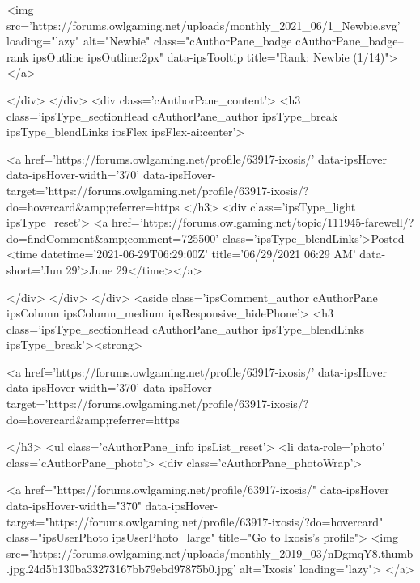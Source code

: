 <img src='https://forums.owlgaming.net/uploads/monthly_2021_06/1_Newbie.svg' loading="lazy" alt="Newbie" class="cAuthorPane_badge cAuthorPane_badge--rank ipsOutline ipsOutline:2px" data-ipsTooltip title="Rank: Newbie (1/14)">
					</a>
				
			</div>
		</div>
		<div class='cAuthorPane_content'>
			<h3 class='ipsType_sectionHead cAuthorPane_author ipsType_break ipsType_blendLinks ipsFlex ipsFlex-ai:center'>
				


<a href='https://forums.owlgaming.net/profile/63917-ixosis/' data-ipsHover data-ipsHover-width='370' data-ipsHover-target='https://forums.owlgaming.net/profile/63917-ixosis/?do=hovercard&amp;referrer=https%
			</h3>
			<div class='ipsType_light ipsType_reset'>
				<a href='https://forums.owlgaming.net/topic/111945-farewell/?do=findComment&amp;comment=725500' class='ipsType_blendLinks'>Posted <time datetime='2021-06-29T06:29:00Z' title='06/29/2021 06:29  AM' data-short='Jun 29'>June 29</time></a>
				
			</div>
		</div>
	</div>
	<aside class='ipsComment_author cAuthorPane ipsColumn ipsColumn_medium ipsResponsive_hidePhone'>
		<h3 class='ipsType_sectionHead cAuthorPane_author ipsType_blendLinks ipsType_break'><strong>


<a href='https://forums.owlgaming.net/profile/63917-ixosis/' data-ipsHover data-ipsHover-width='370' data-ipsHover-target='https://forums.owlgaming.net/profile/63917-ixosis/?do=hovercard&amp;referrer=https%
			
		</h3>
		<ul class='cAuthorPane_info ipsList_reset'>
			<li data-role='photo' class='cAuthorPane_photo'>
				<div class='cAuthorPane_photoWrap'>
					


	<a href="https://forums.owlgaming.net/profile/63917-ixosis/" data-ipsHover data-ipsHover-width="370" data-ipsHover-target="https://forums.owlgaming.net/profile/63917-ixosis/?do=hovercard" class="ipsUserPhoto ipsUserPhoto_large" title="Go to Ixosis's profile">
		<img src='https://forums.owlgaming.net/uploads/monthly_2019_03/nDgmqY8.thumb.jpg.24d5b130ba33273167bb79ebd97875b0.jpg' alt='Ixosis' loading="lazy">
	</a>

